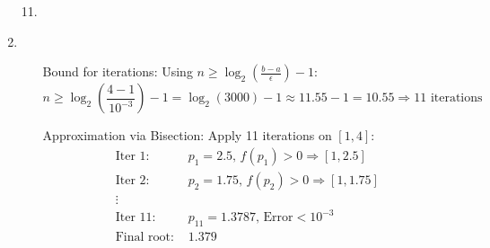 \begin{enumerate}
    \item[11.]
    \item
      \begin{itemize}
        \item[Bound for iterations:]
          Using \( n \geq \log_2\left(\frac{b - a}{\epsilon}\right) - 1 \):
          \[
            n \geq \log_2\left(\frac{4 - 1}{10^{-3}}\right) - 1 =
            \log_2(3000) - 1 \approx 11.55 - 1 = 10.55 \Rightarrow
            \boxed{11} \text{ iterations}
          \]

        \item[Approximation via Bisection:] Apply 11 iterations on \( [1, 4] \):
          \[
            \begin{aligned}
              \text{Iter 1: } & p_1 = 2.5, \, f(p_1) > 0 \Rightarrow [1, 2.5] \\
              \text{Iter 2: } & p_2 = 1.75, \, f(p_2) > 0 \Rightarrow
              [1, 1.75] \\
              \vdots \\
              \text{Iter 11: } & p_{11} = 1.3787, \, \text{Error} < 10^{-3} \\
              \text{Final root: } & \boxed{1.379}
            \end{aligned}
          \]
      \end{itemize}

  \end{enumerate}

  \newpage
